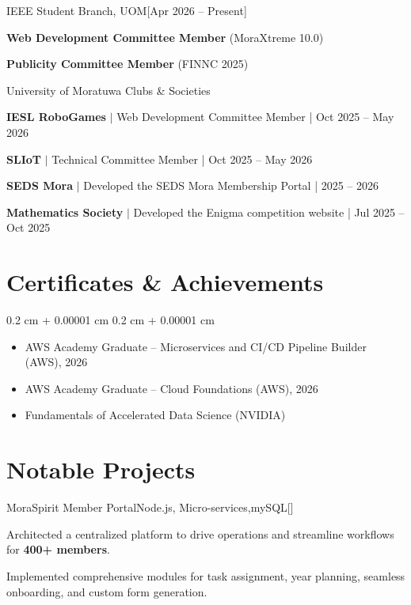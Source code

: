 \documentclass[10pt, letterpaper]{article}
\newenvironment{highlightsforbulletentries}{
    \begin{itemize}[
        topsep=0.08 cm,
        parsep=0pt,
        partopsep=0pt,
        itemsep=0.04 cm,
        leftmargin=10pt
    ]
}{
    \end{itemize}
}
\newenvironment{onecolentry}{
    \begin{adjustwidth}{
        0.2 cm + 0.00001 cm
    }{
        0.2 cm + 0.00001 cm
    }
}{
    \end{adjustwidth}
    \vspace{0.12cm}
}
\let\hrefWithoutArrow\href
\renewcommand{\href}[2]{\hrefWithoutArrow{#1}{\ifthenelse{\equal{#2}{}}{ }{#2 }\raisebox{.15ex}{\footnotesize \faExternalLink*}}}
\newcommand{\activity}[3]{\textbf{#1} $|$ #2 \textcolor{lightblack}{| #3}}
\newcommand{\live}[1]{\hfill\hrefWithoutArrow{#1}{\faExternalLink*}}
\begin{document}
    \begin{experience}{IEEE Student Branch, UOM}[Apr 2026 -- Present]
        \item \textbf{Web Development Committee Member} (MoraXtreme 10.0)
        \item \textbf{Publicity Committee Member} (FINNC 2025)
    \end{experience}

    \vspace{0.15cm}

    \begin{experience}{University of Moratuwa Clubs \& Societies}
        \item \activity{IESL RoboGames}{Web Development Committee Member}{Oct 2025 -- May 2026}
        \item \activity{SLIoT}{Technical Committee Member}{Oct 2025 -- May 2026}
        \item \activity{SEDS Mora}{Developed the SEDS Mora Membership Portal}{2025 -- 2026}
        \item \activity{Mathematics Society}{Developed the Enigma competition website}{Jul 2025 -- Oct 2025}
    \end{experience}

    \section{Certificates \& Achievements}
    \begin{onecolentry}
        \begin{highlightsforbulletentries}
            \item AWS Academy Graduate -- Microservices and CI/CD Pipeline Builder (AWS), 2026
            \item AWS Academy Graduate -- Cloud Foundations (AWS), 2026
            \item Fundamentals of Accelerated Data Science (NVIDIA)
        \end{highlightsforbulletentries}
    \end{onecolentry}

    \section{Notable Projects}
    \begin{project}{MoraSpirit Member Portal}{Node.js, Micro-services,mySQL}[\live{https://app.moraspirit.com}]
        \item Architected a centralized platform to drive operations and streamline workflows for \textbf{400+ members}.
        \item Implemented comprehensive modules for task assignment, year planning, seamless onboarding, and custom form generation.
    \end{project}
\end{document}
